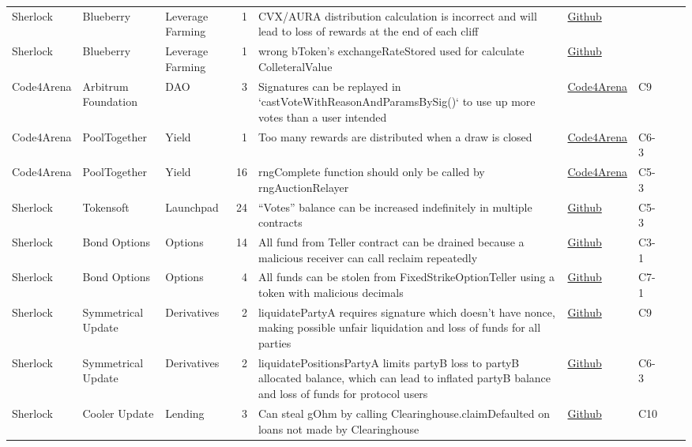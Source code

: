 \documentclass[11pt]{article}
\begin{document}
\begin{center}
\begin{tabular}{lllrlllll}
Sherlock & Blueberry & Leverage Farming & 1 & CVX/AURA distribution calculation is incorrect and will lead to loss of rewards at the end of each cliff & \href{https://github.com/sherlock-audit/2023-07-blueberry-judging/issues/100}{Github} &  &  & \\[0pt]
Sherlock & Blueberry & Leverage Farming & 1 & wrong bToken's exchangeRateStored used for calculate ColleteralValue & \href{https://github.com/sherlock-audit/2023-07-blueberry-judging/issues/117}{Github} &  &  & \\[0pt]
Code4Arena & Arbitrum Foundation & DAO & 3 & Signatures can be replayed in `castVoteWithReasonAndParamsBySig()` to use up more votes than a user intended & \href{https://code4rena.com/reports/2023-08-arbitrum}{Code4Arena} & C9 &  & \\[0pt]
Code4Arena & PoolTogether & Yield & 1 & Too many rewards are distributed when a draw is closed & \href{https://code4rena.com/reports/2023-08-pooltogether}{Code4Arena} & C6-3 &  & \\[0pt]
Code4Arena & PoolTogether & Yield & 16 & rngComplete function should only be called by rngAuctionRelayer & \href{https://code4rena.com/reports/2023-08-pooltogether}{Code4Arena} & C5-3 &  & \\[0pt]
Sherlock & Tokensoft & Launchpad & 24 & ``Votes'' balance can be increased indefinitely in multiple contracts & \href{https://github.com/sherlock-audit/2023-06-tokensoft-judging/issues/41}{Github} & C5-3 &  & \\[0pt]
Sherlock & Bond Options & Options & 14 & All fund from Teller contract can be drained because a malicious receiver can call reclaim repeatedly & \href{https://github.com/sherlock-audit/2023-06-bond-judging/issues/79}{Github} & C3-1 &  & \\[0pt]
Sherlock & Bond Options & Options & 4 & All funds can be stolen from FixedStrikeOptionTeller using a token with malicious decimals & \href{https://github.com/sherlock-audit/2023-06-bond-judging/issues/90}{Github} & C7-1 &  & \\[0pt]
Sherlock & Symmetrical Update & Derivatives & 2 & liquidatePartyA requires signature which doesn't have nonce, making possible unfair liquidation and loss of funds for all parties & \href{https://github.com/sherlock-audit/2023-08-symmetrical-judging/issues/5}{Github} & C9 &  & \\[0pt]
Sherlock & Symmetrical Update & Derivatives & 2 & liquidatePositionsPartyA limits partyB loss to partyB allocated balance, which can lead to inflated partyB balance and loss of funds for protocol users & \href{https://github.com/sherlock-audit/2023-08-symmetrical-judging/issues/6}{Github} & C6-3 &  & \\[0pt]
Sherlock & Cooler Update & Lending & 3 & Can steal gOhm by calling Clearinghouse.claimDefaulted on loans not made by Clearinghouse & \href{https://github.com/sherlock-audit/2023-08-cooler-judging/issues/28}{Github} & C10 &  & \\[0pt]
\end{tabular}
\end{center}
\end{document}
